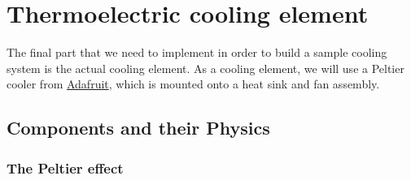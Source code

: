 
\chapter{Thermoelectric cooling element}\label{chap:tec}

The final part that we need to implement in order to build a sample cooling system is the actual cooling element. As a cooling element, we will use a Peltier cooler from \href{https://www.adafruit.com/product/1335}{Adafruit}, which is mounted onto a heat sink and fan assembly.


\section{Components and their Physics}

\subsection{The Peltier effect}\label{sec:tec:peltier_effect}

